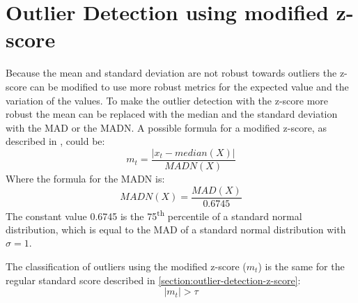 \section{Outlier Detection using modified z-score}
Because the mean and standard deviation are not robust towards outliers the z-score can be modified to use more robust metrics for the expected value and the variation of the values. To make the outlier detection with the z-score more robust the mean can be replaced with the median and the standard deviation with the \ac{MAD} or the \ac{MADN}. A possible formula for a modified z-score, as described in \cite{baeOutlierDetectionSmoothing2019}, could be:
\begin{equation*}
  m_t = \frac{|x_t - median(X)|}{MADN(X)}
\end{equation*}
Where the formula for the \ac{MADN} is:
\begin{equation*}
  MADN(X) = \frac{MAD(X)}{0.6745}
\end{equation*}
The constant value 0.6745 is the 75\textsuperscript{th} percentile of a standard normal distribution, which is equal to the \ac{MAD} of a standard normal distribution with $\sigma = 1$.
\cite{baeOutlierDetectionSmoothing2019}
\par
The classification of outliers using the modified z-score ($m_t$) is the same for the regular standard score described in \autoref{section:outlier-detection-z-score}:
\begin{equation*}
  |m_t| > \tau
\end{equation*}


